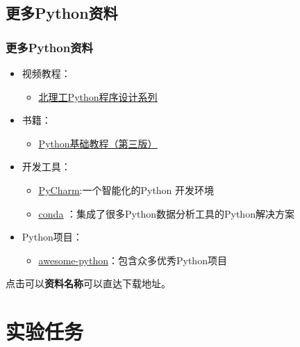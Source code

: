 \documentclass[11pt]{beamer}
\begin{document}
\subsection{更多Python资料}
\begin{frame}[fragile]
	\frametitle{更多Python资料}

	\begin{itemize}
		\item 	视频教程：
		      \begin{itemize}
			      \item \href{http://www.icourse163.org/course/BIT-268001}{\underline{北理工Python程序设计系列}}
		      \end{itemize}

		\item 	书籍：
		      \begin{itemize}
			      \item \href{https://item.jd.com/12279949.html}{\underline{Python基础教程（第三版）}}
		      \end{itemize}

		\item 	开发工具：
		      \begin{itemize}
			      \item \href{https://www.jetbrains.com/pycharm/}{\underline{PyCharm}}:一个智能化的Python 开发环境
			      \item \href{https://www.anaconda.com/products/individual}{\underline{conda}} ：集成了很多Python数据分析工具的Python解决方案
		      \end{itemize}

		\item 	Python项目：
		      \begin{itemize}
			      \item \href{https://github.com/vinta/awesome-python}{\underline{awesome-python}}：包含众多优秀Python项目
		      \end{itemize}
	\end{itemize}

	{\small 点击可以\textbf{资料名称}可以直达下载地址}。
\end{frame}

\section{实验任务}
\end{document}
